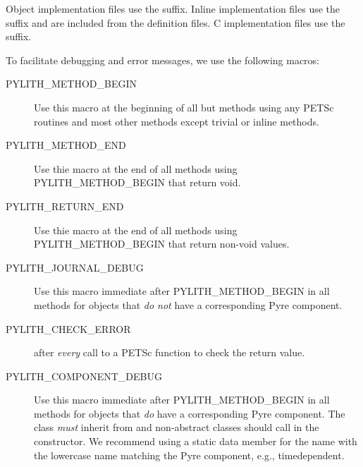 Object implementation files use the  suffix. Inline
implementation files use the  suffix and are included
from the definition files. C implementation files use the 
suffix.

To facilitate debugging and error messages, we use the following
macros:
\begin{description}
\item[PYLITH\_METHOD\_BEGIN] Use this macro at the beginning of all
  but methods using any PETSc routines and most other methods except
  trivial or inline methods.
\item[PYLITH\_METHOD\_END] Use thie macro at the end of all methods
  using PYLITH\_METHOD\_BEGIN that return void.
\item[PYLITH\_RETURN\_END] Use thie macro at the end of all methods
  using PYLITH\_METHOD\_BEGIN that return non-void values.
\item[PYLITH\_JOURNAL\_DEBUG] Use this macro immediate after
  PYLITH\_METHOD\_BEGIN in all methods for objects that {\em do not} have a corresponding
  Pyre component.
\item[PYLITH\_CHECK\_ERROR] after {\em every} call to a PETSc function
  to check the return value.
\item[PYLITH\_COMPONENT\_DEBUG] Use this macro immediate after
  PYLITH\_METHOD\_BEGIN in all methods for objects that {\em do} have
  a corresponding Pyre component. The class {\em must} inherit from
   and non-abstract classes
  should call  in the constructor. We
  recommend using a static data member for the name with the lowercase
  name matching the Pyre component, e.g., timedependent.
\end{description}

